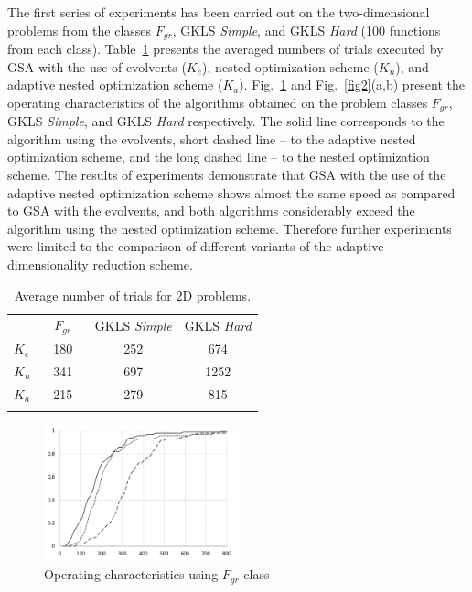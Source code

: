 \documentclass[runningheads]{llncs}
\begin{document}
The first series of experiments has been carried out on the two-dimensional problems from the classes $F_{gr}$, GKLS 
\textit{Simple}, and GKLS \textit{Hard} (100 functions from each class). Table~\ref{tab1} presents the averaged 
numbers of trials executed by GSA with the use of evolvents ($K_e$), nested optimization scheme ($K_n$), and adaptive 
nested optimization scheme ($K_a$). Fig.~\ref{fig1} and Fig.~\ref{fig2}(a,b) present the operating characteristics of the 
algorithms obtained on the problem classes $F_{gr}$, GKLS \textit{Simple}, and GKLS \textit{Hard} respectively. The solid 
line corresponds to the algorithm using the evolvents, short dashed line -- to the adaptive nested optimization scheme, and 
the long dashed line -- to the nested optimization scheme. The results of experiments demonstrate that GSA with the use of 
the adaptive nested optimization scheme shows almost the same speed as compared to GSA with the evolvents, and 
both algorithms considerably exceed the algorithm using the nested optimization scheme. Therefore further experiments 
were limited to the comparison of different variants of the adaptive  dimensionality reduction scheme. 

\begin{table}
\centering
\caption{Average number of trials for 2D problems.}\label{tab1}
\begin{tabular}{lccc}
\hline\noalign{\smallskip}
 &  $\;\;\;F_{gr}\;\;\;$  &  GKLS \textit{Simple} &  GKLS \textit{Hard} \\
\noalign{\smallskip}\hline\noalign{\smallskip}
 $K_e$ & 180  & 252 & 674 \\
 $K_n$ & 341  & 697 & 1252 \\
 $K_a$ & 215  & 279 & 815 \\
\noalign{\smallskip}\hline
\end{tabular}
\end{table}

\begin{figure}
\centering
\includegraphics[width=0.50\textwidth]{2D.pdf}
\caption{Operating characteristics using $F_{gr}$ class} 
\label{fig1}
\end{figure}
\end{document}
